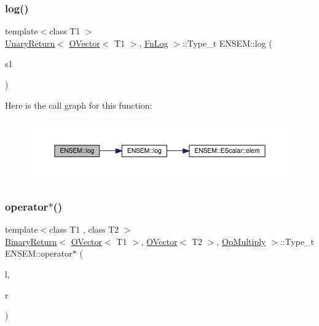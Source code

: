 \subsubsection{\texorpdfstring{log()}{log()}}
{\footnotesize\ttfamily template$<$class T1 $>$ \\
\mbox{\hyperlink{structENSEM_1_1UnaryReturn}{Unary\+Return}}$<$ \mbox{\hyperlink{classENSEM_1_1OVector}{O\+Vector}}$<$ T1 $>$, \mbox{\hyperlink{structENSEM_1_1FnLog}{Fn\+Log}} $>$\+::Type\+\_\+t E\+N\+S\+E\+M\+::log (\begin{DoxyParamCaption}\item[{const \mbox{\hyperlink{classENSEM_1_1OVector}{O\+Vector}}$<$ T1 $>$ \&}]{s1 }\end{DoxyParamCaption})\hspace{0.3cm}{\ttfamily [inline]}}

Here is the call graph for this function\+:\nopagebreak
\begin{figure}[H]
\begin{center}
\leavevmode
\includegraphics[width=350pt]{da/d59/group__obsvector_gaed658cf17815056e3f361233ba070ae0_cgraph}
\end{center}
\end{figure}
\mbox{\label{group__obsvector_gaa0cd2e75ed42d1c8d749cbc22ea5d244}} 
\subsubsection{\texorpdfstring{operator$\ast$()}{operator*()}\hspace{0.1cm}{\footnotesize\ttfamily [1/8]}}
{\footnotesize\ttfamily template$<$class T1 , class T2 $>$ \\
\mbox{\hyperlink{structENSEM_1_1BinaryReturn}{Binary\+Return}}$<$ \mbox{\hyperlink{classENSEM_1_1OVector}{O\+Vector}}$<$ T1 $>$, \mbox{\hyperlink{classENSEM_1_1OVector}{O\+Vector}}$<$ T2 $>$, \mbox{\hyperlink{structENSEM_1_1OpMultiply}{Op\+Multiply}} $>$\+::Type\+\_\+t E\+N\+S\+E\+M\+::operator$\ast$ (\begin{DoxyParamCaption}\item[{const \mbox{\hyperlink{classENSEM_1_1OVector}{O\+Vector}}$<$ T1 $>$ \&}]{l,  }\item[{const \mbox{\hyperlink{classENSEM_1_1OVector}{O\+Vector}}$<$ T2 $>$ \&}]{r }\end{DoxyParamCaption})\hspace{0.3cm}{\ttfamily [inline]}}

